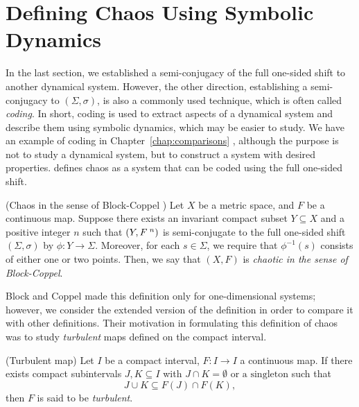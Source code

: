 \documentclass[10pt,twoside]{book}
\begin{document}
\section{Defining Chaos Using Symbolic Dynamics}
In the last section, we established a semi-conjugacy of the full one-sided shift to another dynamical system.
However, the other direction, establishing a semi-conjugacy to $(\Sigma, \sigma)$, is also a commonly used technique, which is often called \textit{coding}.
In short, coding is used to extract aspects of a dynamical system and describe them using symbolic dynamics, which may be easier to study.
We have an example of coding in Chapter~\ref{chap:comparisons} , although the purpose is not to study a dynamical system, but to construct a system with desired properties.
\citet{blockcoppel} defines chaos as a system that can be coded using the full one-sided shift.
\begin{definition}
  (Chaos in the sense of Block-Coppel \citep{blockcoppel})
  Let $X$ be a metric space, and $F$ be a continuous map.
  Suppose there exists an invariant compact subset $Y \subseteq X$ and a positive integer $n$ such that $(Y,F^{\;n})$ is semi-conjugate to the full one-sided shift $(\Sigma, \sigma)$ by $\phi: Y \to \Sigma$.
  Moreover, for each $s \in \Sigma$, we require that $\phi^{-1}(s)$ consists of either one or two points.
  Then, we say that $(X,F)$ is \textit{chaotic in the sense of Block-Coppel}.
  \begin{center}
  \end{center}
  \label{defn:blockcoppel}
\end{definition}
Block and Coppel made this definition only for one-dimensional systems; however, we consider the extended version of the definition in order to compare it with other definitions.
Their motivation in formulating this definition of chaos was to study \textit{turbulent} maps defined on the compact interval.
\begin{definition}
  (Turbulent map)
  Let $I$ be a compact interval, $F: I \to I$ a continuous map.
  If there exists compact subintervals $J,K \subseteq I$ with $J \cap K = \emptyset \mbox{ or a singleton}$ such that
  \begin{equation*}
    J \cup K \subseteq F(J) \cap F(K),
  \end{equation*}
  then $F$ is said to be \textit{turbulent}.
\end{definition}
\end{document}
